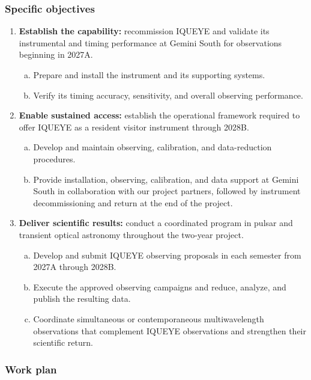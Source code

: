 \documentclass[
    11pt,
    a4paper,
    ]{article}
\begin{document}
\subsubsection{Specific objectives}

\begin{enumerate}[O1.]
  \item \textbf{Establish the capability:} recommission IQUEYE and validate its instrumental and timing performance at Gemini South for observations beginning in 2027A.
  \begin{enumerate}[(a)]
    \item Prepare and install the instrument and its supporting systems.
    \item Verify its timing accuracy, sensitivity, and overall observing performance.
  \end{enumerate}

  \item \textbf{Enable sustained access:} establish the operational framework required to offer IQUEYE as a resident visitor instrument through 2028B.
  \begin{enumerate}[(a)]
    \item Develop and maintain observing, calibration, and data-reduction procedures.
    \item Provide installation, observing, calibration, and data support at Gemini South in collaboration with our project partners, followed by instrument decommissioning and return at the end of the project.
  \end{enumerate}

  \item \textbf{Deliver scientific results:} conduct a coordinated program in pulsar and transient optical astronomy throughout the two-year project.
  \begin{enumerate}[(a)]
    \item Develop and submit IQUEYE observing proposals in each semester from 2027A through 2028B.
    \item Execute the approved observing campaigns and reduce, analyze, and publish the resulting data.
    \item Coordinate simultaneous or contemporaneous multiwavelength observations that complement IQUEYE observations and strengthen their scientific return.
  \end{enumerate}
\end{enumerate}

\subsubsection{Work plan}
\end{document}
